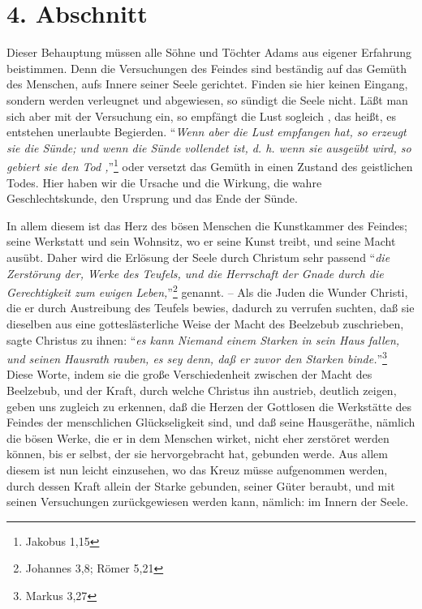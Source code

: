 \section{4. Abschnitt} \label{kap3_ab4} 

Dieser Behauptung müssen alle Söhne und Töchter Adams aus eigener Erfahrung
beistimmen. Denn die Versuchungen des Feindes sind beständig auf das Gemüth des
Menschen, aufs Innere seiner Seele gerichtet. Finden sie hier keinen Eingang,
sondern werden verleugnet und abgewiesen, so sündigt die Seele nicht. Läßt man
sich aber mit der Versuchung ein, so empfängt die Lust sogleich , das heißt, es
entstehen unerlaubte Begierden. "`\textit{Wenn aber die Lust empfangen hat, so erzeugt
sie die Sünde; und wenn die Sünde vollendet ist, d. h. wenn sie ausgeübt wird,
so gebiert sie den Tod ,}"'\footnote{Jakobus 1,15} oder versetzt das Gemüth in einen
Zustand des geistlichen Todes. Hier haben wir die Ursache und die Wirkung, die
wahre Geschlechtskunde, den Ursprung und das Ende der Sünde.

\medskip

In allem diesem ist das Herz des bösen Menschen die Kunstkammer des Feindes;
seine Werkstatt und sein Wohnsitz, wo er seine Kunst treibt, und seine Macht
ausübt. Daher wird die Erlösung der Seele durch Christum sehr passend "`\textit{die
Zerstörung der, Werke des Teufels, und die Herrschaft der Gnade durch die
Gerechtigkeit zum ewigen Leben,}"'\footnote{Johannes 3,8; Römer 5,21} genannt. -- Als
die Juden die Wunder Christi, die er durch Austreibung des Teufels bewies,
dadurch zu verrufen suchten, daß sie dieselben aus eine gotteslästerliche Weise
der Macht des Beelzebub zuschrieben, sagte Christus zu ihnen: "`\textit{es kann Niemand
einem Starken in sein Haus fallen, und seinen Hausrath rauben, es sey denn, daß
er zuvor den Starken binde.}"'\footnote{Markus 3,27} Diese Worte, indem sie die
große Verschiedenheit zwischen der Macht des Beelzebub, und der Kraft, durch
welche Christus ihn austrieb, deutlich zeigen, geben uns zugleich zu erkennen,
daß die Herzen der Gottlosen die Werkstätte des Feindes der menschlichen
Glückseligkeit sind, und daß seine Hausgeräthe, nämlich die bösen Werke, die er
in dem Menschen wirket, nicht eher zerstöret werden können, bis er selbst, der
sie hervorgebracht hat, gebunden werde. Aus allem diesem ist nun leicht
einzusehen, wo das Kreuz müsse aufgenommen werden, durch dessen Kraft allein der
Starke gebunden, seiner Güter beraubt, und mit seinen Versuchungen
zurückgewiesen werden kann, nämlich: im Innern der Seele.

